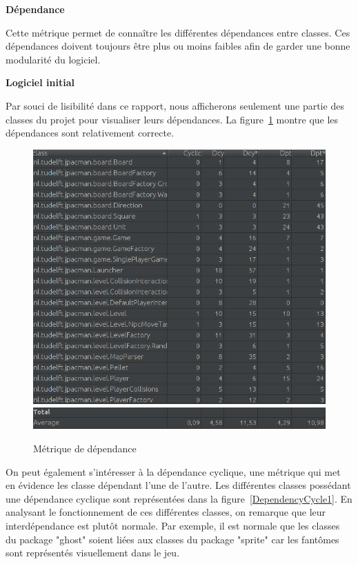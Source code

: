 \documentclass[12pt, openany]{report}
\begin{document}
\newpage
\textbf{Dépendance}


Cette métrique permet de connaître les différentes dépendances entre classes. Ces dépendances doivent toujours être plus ou moins faibles afin de garder une bonne modularité du logiciel.

\textbf{Logiciel initial}

Par souci de lisibilité dans ce rapport, nous afficherons seulement une partie des classes du projet pour visualiser leurs dépendances. La figure~\ref{DependencyMetrics1} montre que les dépendances sont relativement correcte.

\begin{figure}[!h]
	\centering
	\includegraphics[scale=0.5]{Images/DependencyMetrics1.png}
	\includegraphics[scale=0.5]{Images/DependencyMetricsBis1.png}  
	\caption{Métrique de dépendance}
	\label{DependencyMetrics1}
\end{figure}
\newpage
 On peut également s’intéresser à la dépendance cyclique, une métrique qui met en évidence les classe dépendant l'une de l'autre. Les différentes classes possédant une dépendance cyclique sont représentées dans la figure~\ref{DependencyCycle1}. En analysant le fonctionnement de ces différentes classes, on remarque que leur interdépendance est plutôt normale. Par exemple, il est normale que les classes du package "ghost" soient liées aux classes du package "sprite" car les fantômes sont représentés visuellement dans le jeu.
\end{document}
